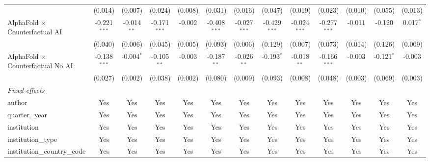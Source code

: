 \begin{tabular}{lcccccccccccc}
                                            & (0.014)        & (0.007)       & (0.024)        & (0.008) & (0.031)        & (0.016)        & (0.047)        & (0.019)        & (0.023)        & (0.010)      & (0.055)      & (0.013)\\   
   AlphaFold $\times$ Counterfactual AI     & -0.221$^{***}$ & -0.014$^{**}$ & -0.171$^{***}$ & -0.002  & -0.408$^{***}$ & -0.027$^{***}$ & -0.429$^{***}$ & -0.024$^{***}$ & -0.277$^{***}$ & -0.011       & -0.120       & 0.017$^{*}$\\   
                                            & (0.040)        & (0.006)       & (0.045)        & (0.005) & (0.093)        & (0.006)        & (0.129)        & (0.007)        & (0.073)        & (0.014)      & (0.126)      & (0.009)\\   
   AlphaFold $\times$ Counterfactual No AI  & -0.138$^{***}$ & -0.004$^{*}$  & -0.105$^{**}$  & -0.003  & -0.187$^{**}$  & -0.026$^{**}$  & -0.193$^{*}$   & -0.018$^{**}$  & -0.166$^{***}$ & -0.003       & -0.121$^{*}$ & -0.003\\   
                                            & (0.027)        & (0.002)       & (0.038)        & (0.002) & (0.080)        & (0.009)        & (0.093)        & (0.008)        & (0.048)        & (0.003)      & (0.069)      & (0.003)\\   
   \midrule
   \emph{Fixed-effects}\\
   author                                   & Yes            & Yes           & Yes            & Yes     & Yes            & Yes            & Yes            & Yes            & Yes            & Yes          & Yes          & Yes\\  
   quarter\_year                            & Yes            & Yes           & Yes            & Yes     & Yes            & Yes            & Yes            & Yes            & Yes            & Yes          & Yes          & Yes\\  
   institution                              & Yes            & Yes           & Yes            & Yes     & Yes            & Yes            & Yes            & Yes            & Yes            & Yes          & Yes          & Yes\\  
   institution\_type                        & Yes            & Yes           & Yes            & Yes     & Yes            & Yes            & Yes            & Yes            & Yes            & Yes          & Yes          & Yes\\  
   institution\_country\_code               & Yes            & Yes           & Yes            & Yes     & Yes            & Yes            & Yes            & Yes            & Yes            & Yes          & Yes          & Yes\\  

\end{tabular}
